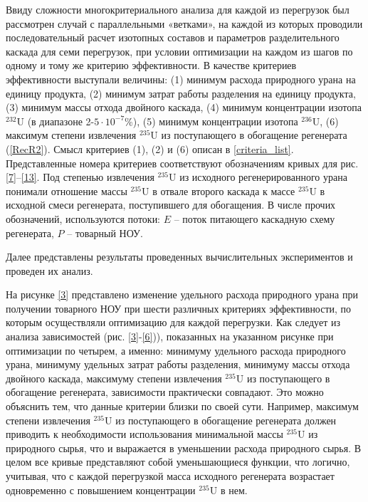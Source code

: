 Ввиду сложности многокритериального анализа для каждой из перегрузок был рассмотрен случай с параллельными «ветками», на каждой из которых проводили последовательный расчет изотопных составов и параметров разделительного каскада для семи перегрузок, при условии оптимизации на каждом из шагов по одному и тому же критерию эффективности. В качестве критериев эффективности выступали величины: (1) минимум расхода природного урана на единицу продукта, (2) минимум затрат работы разделения на единицу продукта, (3) минимум массы отхода двойного каскада, (4) минимум концентрации изотопа $^{232}$U (в диапазоне 2-$5\cdot10^{-7}$\%), (5) минимум концентрации изотопа $^{236}$U, (6) максимум степени извлечения $^{235}$U из поступающего в обогащение регенерата (\ref{RecR2}). Смысл критериев (1), (2) и (6) описан в \ref{criteria_list}. Представленные номера критериев соответствуют обозначениям кривых для рис. \ref{7}–\ref{13}. Под степенью извлечения $^{235}$U из исходного регенерированного урана понимали отношение массы $^{235}$U в отвале второго каскада к массе $^{235}$U в исходной смеси регенерата, поступившего для обогащения. В числе прочих обозначений, используются потоки: $E$ – поток питающего каскадную схему регенерата, $P$ -- товарный НОУ.


Далее представлены результаты проведенных вычислительных экспериментов и проведен их анализ.

На рисунке \ref{3} представлено изменение удельного расхода природного урана при получении товарного НОУ при шести различных критериях эффективности, по которым осуществляли оптимизацию для каждой перегрузки. Как следует из анализа зависимостей (рис. \ref{3}-\ref{6})), показанных на указанном рисунке при оптимизации по четырем, а именно: минимуму удельного расхода природного урана, минимуму удельных затрат работы разделения, минимуму массы отхода двойного каскада, максимуму степени извлечения $^{235}$U из поступающего в обогащение регенерата, зависимости практически совпадают. Это можно объяснить тем, что данные критерии близки по своей сути. Например, максимум степени извлечения $^{235}$U из поступающего в обогащение регенерата должен приводить к необходимости использования минимальной массы $^{235}$U из природного сырья, что и выражается в уменьшении расхода природного сырья. В целом все кривые представляют собой уменьшающиеся функции, что логично, учитывая, что с каждой перегрузкой масса исходного регенерата возрастает одновременно с повышением концентрации $^{235}$U в нем.


